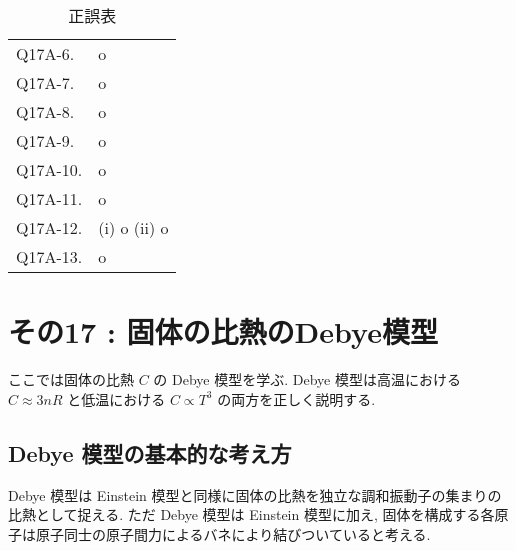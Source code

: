 \documentclass[uplatex,dvipdfmx,a4paper,11pt]{jlreq}
\theoremstyle{definition}
\begin{document}
\begin{table}[hbtp]
\begin{tabular}{ll}
    Q17A-6.  & o                                                                                                                     \\
    Q17A-7.  & o                                                                                                                     \\
    Q17A-8.  & o                                                                                                                     \\
    Q17A-9.  & o                                                                                                                     \\
    Q17A-10. & o                                                                                                                     \\
    Q17A-11. & o                                                                                                                     \\
    Q17A-12. & (i) o (ii) o                                                                                                          \\
    Q17A-13. & o                                                                                                                     \\
    \hline
  \end{tabular}
  \caption{正誤表}
\end{table}
\clearpage
\section{その17 : 固体の比熱のDebye模型}
ここでは固体の比熱 $C$ の Debye 模型を学ぶ. Debye 模型は高温における $C\approx 3nR$ と低温における $C\propto T^3$ の両方を正しく説明する.
\subsection{Debye 模型の基本的な考え方}
Debye 模型は Einstein 模型と同様に固体の比熱を独立な調和振動子の集まりの比熱として捉える. ただ Debye 模型は Einstein 模型に加え, 固体を構成する各原子は原子同士の原子間力によるバネにより結びついていると考える.
\end{document}
